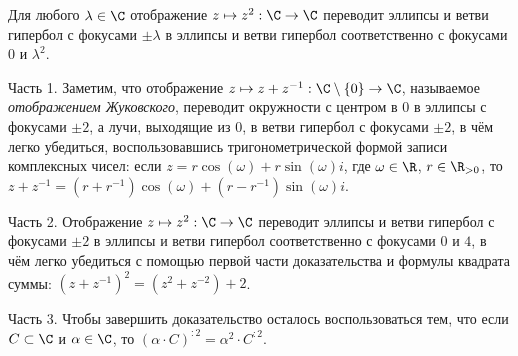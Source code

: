 \documentclass[
	extrafontsizes,
	11pt,
	hyphens,
]{memoir}
\begin{document}
\begin{theorem}
Для любого \(\lambda \in \C\) отображение \(z \mapsto z^2 : \C \to \C\) переводит%
\label{the:HookeKeplerComplexSquare}
эллипсы и ветви гипербол с фокусами \(\pm \lambda\) в эллипсы и ветви гипербол соответственно с фокусами \(0\) и \(\lambda^2\).
\end{theorem}

\begin{proofparts}

\item[Часть 1.]
Заметим, что отображение
\(z \mapsto z + z^{-1} : \C \setminus \{0\} \to \C\),
называемое \emph{отображением Жуковского},
переводит окружности с центром в \(0\) в эллипсы с фокусами \(\pm 2\),
а лучи, выходящие из \(0\), в ветви гипербол с фокусами \(\pm 2\),
в чём легко убедиться, воспользовавшись тригонометрической формой записи комплексных чисел:
если
\(z = r \cos(\omega) + r \sin(\omega) i\),
где \(\omega \in \R\), \(r \in \R_{>0}\),
то
\(z + z^{-1} = (r + r^{-1}) \cos(\omega) + (r - r^{-1}) \sin(\omega) i\).

\item[Часть 2.]
Отображение \(z \mapsto z^2 : \C \to \C\) переводит эллипсы и ветви гипербол с фокусами \(\pm 2\) в эллипсы и ветви гипербол соответственно с фокусами \(0\) и \(4\),
в чём легко убедиться с помощью первой части доказательства и формулы квадрата суммы: \((z + z^{-1})^2 = (z^2 + z^{-2}) + 2\).

\item[Часть 3.]
Чтобы завершить доказательство осталось воспользоваться тем, что если \(C \subset \C\) и \(\alpha \in \C\),
то \((\alpha \cdot C)^{:2} = \alpha^2 \cdot C^{:2}\).
\qedhere



\end{proofparts}
\end{document}
